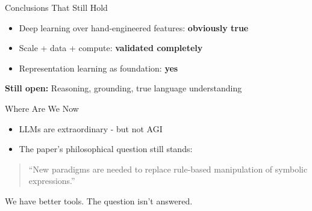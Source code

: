 \begin{frame}{Conclusions That Still Hold}
    \begin{itemize}
        \item Deep learning over hand-engineered features: \textbf{obviously true}
        \item Scale + data + compute: \textbf{validated completely}
        \item Representation learning as foundation: \textbf{yes}
    \end{itemize}
    
    \vspace{1em}
    \textbf{Still open:} Reasoning, grounding, true language understanding
\end{frame}

\begin{frame}{Where Are We Now}
    \begin{itemize}
        \item LLMs are extraordinary - but not AGI
        \item The paper's philosophical question still stands:
    \end{itemize}
    
    \vspace{1em}
    \begin{quote}
        ``New paradigms are needed to replace rule-based manipulation of symbolic expressions.''
    \end{quote}
    
    \vspace{1em}
    We have better tools. The question isn't answered.
\end{frame}
